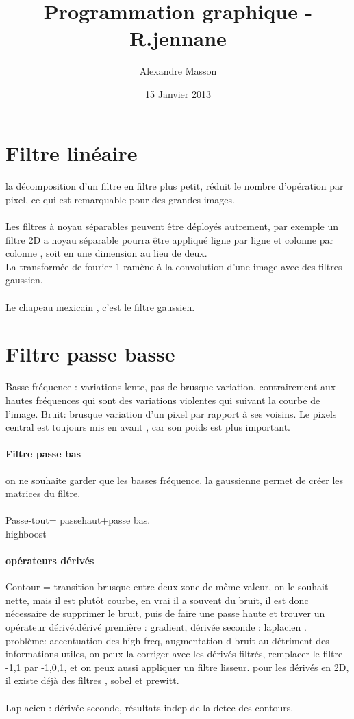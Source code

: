 \documentclass{article}
\title{Programmation graphique - R.jennane}
\author{Alexandre Masson}
\date{15 Janvier 2013}
\begin{document}
\maketitle
\newpage
\tableofcontents
\newpage
\section{Filtre linéaire}
\paragraph{}la décomposition d'un filtre en filtre plus petit, réduit le nombre d'opération par pixel, ce qui est remarquable pour des grandes images.\\\\Les filtres à noyau séparables peuvent être déployés autrement, par exemple un filtre 2D a noyau séparable pourra être appliqué ligne par ligne et colonne par colonne , soit en une dimension au lieu de deux.\\La transformée de fourier-1 ramène à la convolution d'une image avec des filtres gaussien.\\\\
Le chapeau mexicain , c'est le filtre gaussien.
\section{Filtre passe basse} Basse fréquence : variations lente, pas de brusque variation, contrairement aux hautes fréquences qui sont des variations violentes qui suivant la courbe de l'image. Bruit:  brusque variation d'un pixel par rapport à ses voisins. Le pixels central est toujours mis en avant , car son poids est plus important.
\paragraph{Filtre passe bas} on ne souhaite garder que les basses fréquence. la gaussienne permet de créer les matrices du filtre.\\\\Passe-tout= passehaut+passe bas.\\highboost
\paragraph{opérateurs dérivés} Contour  = transition brusque entre deux zone de même valeur, on le souhait nette, mais il est plutôt courbe, en vrai il a souvent du bruit, il est donc nécessaire de supprimer le bruit, puis de faire une passe haute et trouver un opérateur dérivé.dérivé première : gradient, dérivée seconde : laplacien . problème:  accentuation des high freq, augmentation d bruit au détriment des informations utiles, on peux la corriger avec les dérivés filtrés, remplacer le filtre -1,1 par -1,0,1, et on peux aussi appliquer un filtre lisseur. pour les dérivés en 2D, il existe déjà des filtres , sobel et prewitt.\\\\Laplacien : dérivée seconde, résultats indep de la detec des contours.
\end{document}
